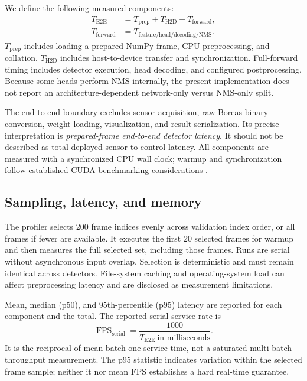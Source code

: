 \documentclass[10pt,twocolumn]{article}
\begin{document}
We define the following measured components:
\begin{align}
T_{\mathrm{E2E}}&=T_{\mathrm{prep}}+T_{\mathrm{H2D}}+T_{\mathrm{forward}},\\
T_{\mathrm{forward}}&=T_{\mathrm{feature/head/decoding/NMS}}.
\end{align}
$T_{\mathrm{prep}}$ includes loading a prepared NumPy frame, CPU preprocessing, and collation. $T_{\mathrm{H2D}}$ includes host-to-device transfer and synchronization. Full-forward timing includes detector execution, head decoding, and configured postprocessing. Because some heads perform NMS internally, the present implementation does not report an architecture-dependent network-only versus NMS-only split.

The end-to-end boundary excludes sensor acquisition, raw Boreas binary conversion, weight loading, visualization, and result serialization. Its precise interpretation is \emph{prepared-frame end-to-end detector latency}. It should not be described as total deployed sensor-to-control latency. All components are measured with a synchronized CPU wall clock; warmup and synchronization follow established CUDA benchmarking considerations \cite{pytorch_benchmark}.

\subsection{Sampling, latency, and memory}
The profiler selects 200 frame indices evenly across validation index order, or all frames if fewer are available. It executes the first 20 selected frames for warmup and then measures the full selected set, including those frames. Runs are serial without asynchronous input overlap. Selection is deterministic and must remain identical across detectors. File-system caching and operating-system load can affect preprocessing latency and are disclosed as measurement limitations.

Mean, median (p50), and 95th-percentile (p95) latency are reported for each component and the total. The reported serial service rate is
\begin{equation}
\operatorname{FPS}_{\mathrm{serial}}=\frac{1000}{\overline T_{\mathrm{E2E}}\ \text{in milliseconds}}.
\end{equation}
It is the reciprocal of mean batch-one service time, not a saturated multi-batch throughput measurement. The p95 statistic indicates variation within the selected frame sample; neither it nor mean FPS establishes a hard real-time guarantee.
\end{document}
